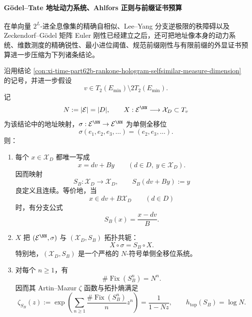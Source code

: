 \paragraph{Gödel--Tate 地址动力系统、Ahlfors 正则与前缀证书预算}
在单向量 \(2^L\)-进全息像集的精确自相似、Lee--Yang 分支逆极限的秩障碍以及 Zeckendorf--Gödel 矩阵 Euler 刚性已经建立之后，还可把地址像本身的动力系统、维数测度的精确锐性、最小进位阈值、规范前缀刚性与有限前缀的外显证书预算进一步压缩为下列诸条结论。

\begin{conclusion}\label{con:xi-time-part62c-godel-tate-address-fullshift-zeta-entropy}
沿用结论 \ref{con:xi-time-part62b-rankone-hologram-selfsimilar-measure-dimension} 的记号，并进一步假设
\[
v\in T_2(E_{\min})\setminus 2T_2(E_{\min}).
\]
记
\[
N:=|\mathcal E|=|D|,
\qquad
X:\mathcal E^{\NN}\longrightarrow \mathcal X_D\subset T_v
\]
为该结论中的地址映射，\(\sigma:\mathcal E^{\NN}\to \mathcal E^{\NN}\) 为单侧全移位
\[
\sigma(e_1,e_2,e_3,\dots)=(e_2,e_3,\dots).
\]
则：
\begin{enumerate}
  \item 每个 \(x\in\mathcal X_D\) 都唯一写成
  \[
  x=dv+By
  \qquad (d\in D,\ y\in\mathcal X_D).
  \]
  因而映射
  \[
  S_B:\mathcal X_D\to \mathcal X_D,
  \qquad
  S_B(dv+By):=y
  \]
  良定义且连续。等价地，当
  \[
  x\in dv+B\mathcal X_D
  \qquad (d\in D)
  \]
  时，有分支公式
  \[
  S_B(x)=\frac{x-dv}{B}.
  \]
  \item \(X\) 把 \((\mathcal E^{\NN},\sigma)\) 与 \((\mathcal X_D,S_B)\) 拓扑共轭：
  \[
  X\circ \sigma=S_B\circ X.
  \]
  特别地，\((\mathcal X_D,S_B)\) 是一个严格的 \(N\)-符号单侧全移位系统。
  \item 对每个 \(n\ge 1\)，有
  \[
  \#\operatorname{Fix}(S_B^n)=N^n.
  \]
  因而其 Artin--Mazur \(\zeta\) 函数与拓扑熵满足
  \[
  \zeta_{S_B}(z)
  :=
  \exp\!\left(\sum_{n\ge 1}\frac{\#\operatorname{Fix}(S_B^n)}{n}z^n\right)
  =
  \frac{1}{1-Nz},
  \qquad
  h_{\mathrm{top}}(S_B)=\log N.
  \]
\end{enumerate}
\end{conclusion}

